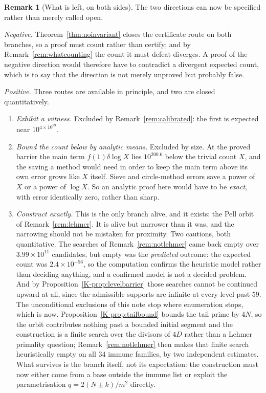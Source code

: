 \documentclass[11pt]{article}
\theoremstyle{definition}
\newtheorem{remark}[theorem]{Remark}
\begin{document}
\begin{remark}[What is left, on both sides]\label{rem:whatisleft}
The two directions can now be specified rather than merely called open.

\emph{Negative.} Theorem~\ref{thm:noinvariant} closes the certificate route on both branches, so a
proof must count rather than certify; and by Remark~\ref{rem:whatcounting} the count it must defeat
diverges. A proof of the negative direction would therefore have to contradict a divergent expected
count, which is to say that the direction is not merely unproved but probably false.

\emph{Positive.} Three routes are available in principle, and two are closed quantitatively.
\begin{enumerate}[label=\textup{(\alph*)},leftmargin=2.2em]
\item \emph{Exhibit a witness.} Excluded by Remark~\ref{rem:calibrated}: the first is expected near
$10^{4\times10^{89}}$.
\item \emph{Bound the count below by analytic means.} Excluded by size. At the proved barrier the
main term $f(1)\delta\log X$ lies $10^{200.6}$ below the trivial count $X$, and the saving a method
would need in order to keep the main term above its own error grows like $X$ itself. Sieve and
circle-method errors save a power of $X$ or a power of $\log X$. So an analytic proof here would
have to be \emph{exact}, with error identically zero, rather than sharp.
\item \emph{Construct exactly.} This is the only branch alive, and it exists: the Pell orbit of
Remark~\ref{rem:lehmer}. It is alive but narrower than it was, and the narrowing should not be
mistaken for proximity. Two cautions, both quantitative. The searches of
Remark~\ref{rem:notlehmer} came back empty over $3.99\times10^{11}$ candidates, but empty was the
\emph{predicted} outcome: the expected count was $2.4\times10^{-56}$, so the computation confirms the
heuristic model rather than deciding anything, and a confirmed model is not a decided problem. And by
Proposition~\ref{K-prop:levelbarrier} those searches cannot be continued upward at all, since the
admissible supports are infinite at every level past $59$. The unconditional exclusions of this note
stop where enumeration stops, which is now.
Proposition~\ref{K-prop:tailbound} bounds the tail prime by $4N$, so the orbit contributes nothing past
a bounded initial segment and the construction is a finite search over the divisors of $4D$ rather
than a Lehmer primality question; Remark~\ref{rem:notlehmer} then makes that finite search
heuristically empty on all $34$ immune families, by two independent estimates. What survives is the
branch itself, not its expectation: the construction must now either come from a base outside the
immune list or exploit the parametrisation $q=2(N\pm k)/m^2$ directly.
\end{enumerate}


\end{remark}
\end{document}

